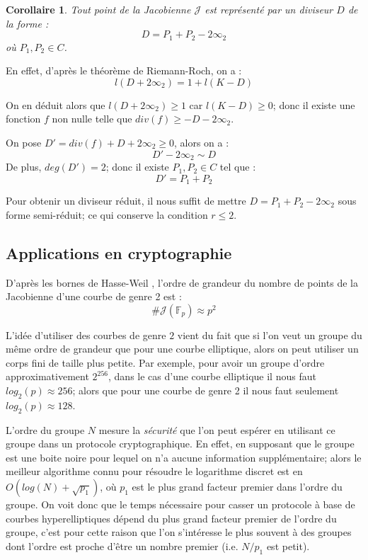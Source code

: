 \documentclass[a4paper]{article}
\newtheorem{corollaire}[theoreme]{Corollaire}
\theoremstyle{definition}
\theoremstyle{remark}
\numberwithin{equation}{section}
\begin{document}
\begin{corollaire}
\label{div_red}
Tout point de la Jacobienne $\mathcal{J}$ est représenté par un diviseur $D$ de la forme :
$$D = P_1 + P_2 - 2\infty_2$$
où $P_1,P_2 \in C$.
\end{corollaire}

En effet, d'après le théorème de Riemann-Roch, on a :
$$l(D+2\infty_2) = 1 + l(K-D)$$

On en déduit alors que $l(D+2\infty_2) \geq 1$ car $l(K-D) \geq 0$; donc il existe une fonction $f$ non nulle telle que $div(f) \geq -D - 2\infty_2$.

On pose $D' = div(f) + D + 2\infty_2 \geq 0$, alors on a :
$$D' - 2\infty_2 \sim D$$
De plus, $deg(D') = 2$; donc il existe $P_1, P_2 \in C$ tel que :
$$D' = P_1 + P_2$$

Pour obtenir un diviseur réduit, il nous suffit de mettre $D = P_1 + P_2 - 2\infty_2$ sous forme semi-réduit; ce qui conserve la condition $r \leq 2$.

\subsection{Applications en cryptographie}
D'après les bornes de Hasse-Weil \citep{weil}, l'ordre de grandeur du nombre de points de la Jacobienne d'une courbe de genre 2 est :
$$\#\mathcal{J}(\mathbb{F}_p) \approx p^2$$

L'idée d'utiliser des courbes de genre $2$ vient du fait que si l'on veut un groupe du même ordre de grandeur que pour une courbe elliptique, alors on peut utiliser un corps fini de taille plus petite. Par exemple, pour avoir un groupe d'ordre approximativement $2^{256}$, dans le cas d'une courbe elliptique il nous faut $log_2(p) \approx 256$; alors que pour une courbe de genre 2 il nous faut seulement $log_2(p) \approx 128$.

L'ordre du groupe $N$ mesure la \emph{sécurité} que l'on peut espérer en utilisant ce groupe dans un protocole cryptographique. En effet, en supposant que le groupe est une boite noire pour lequel on n'a aucune information supplémentaire; alors le meilleur algorithme connu pour résoudre le logarithme discret est en $O(log(N)+\sqrt{p_1})$, où $p_1$ est le plus grand facteur premier dans l'ordre du groupe. On voit donc que le temps nécessaire pour casser un protocole à base de courbes hyperelliptiques dépend du plus grand facteur premier de l'ordre du groupe, c'est pour cette raison que l'on s'intéresse le plus souvent à des groupes dont l'ordre est proche d'être un nombre premier (i.e. $N/p_1$ est petit).
 
\end{document}
